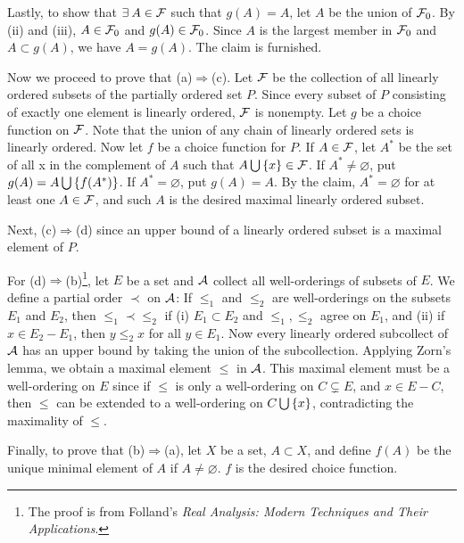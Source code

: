 \begin{pf}
    Lastly, to show that $\exists\: A\in\mathcal{F}$ such that $g(A)=A$, 
    let $A$ be the union of $\mathcal{F}_0$. By (ii) and (iii), $A\in
    \mathcal{F}_0$ and $g(A)\in\mathcal{F}_0$. Since $A$ is the largest member 
    in $\mathcal{F}_0$ and $A\subset g(A)$, we have $A=g(A)$. The claim 
    is furnished. 

    Now we proceed to prove that (a)$\Rightarrow$(c). Let $\mathcal{F}$ 
    be the collection of all linearly ordered subsets of the 
    partially ordered set $P$. Since every subset of $P$ 
    consisting of exactly one element is linearly ordered, $\mathcal{F}$ 
    is nonempty. Let $g$ be a choice function on $\mathcal{F}$. Note 
    that the union of any chain of linearly ordered sets is 
    linearly ordered. Now let $f$ be a choice function for $P$. 
    If $A\in\mathcal{F}$, let $A^*$ be the set of all x in the 
    complement of $A$ such that $A\bigcup\left\{ {x} \right\}\in\mathcal{F}$. If $A^* 
    \neq\varnothing$, put $g(A)=A\bigcup\left\{ {f(A^*)} \right\}$. If 
    $A^*=\varnothing$, put $g(A)=A$. By the claim, $A^*=
    \varnothing$ for at least one $A\in\mathcal{F}$, and such $A$ is the 
    desired maximal linearly ordered subset. 

    Next, (c)$\Rightarrow$(d) since an upper bound of a 
    linearly ordered subset is a maximal element of $P$. 

    For (d)$\Rightarrow$(b)\footnote{The proof is from 
    Folland's \textit{Real Analysis: Modern Techniques and 
    Their Applications}.}, let $E$ be a set and $\mathcal{A}$ collect 
    all well-orderings of subsets of $E$. We define a partial 
    order $\prec$ on $\mathcal{A}$: If $\leq_1$ and $\leq_2$ are 
    well-orderings on the subsets $E_1$ and $E_2$, then 
    $\leq_1\prec\leq_2$ if (i) $E_1\subset E_2$ and $\leq_1, 
    \leq_2$ agree on $E_1$, and (ii) if $x\in E_2-E_1$, then 
    $y\leq_2 x$ for all $y\in E_1$. Now every linearly ordered 
    subcollect of $\mathcal{A}$ has an upper bound by taking the union 
    of the subcollection. Applying Zorn's lemma, we obtain a 
    maximal element $\leq$ in $\mathcal{A}$. This maximal element must 
    be a well-ordering on $E$ since if $\leq$ is only a 
    well-ordering on $C\subsetneq E$, and $x\in E-C$, then 
    $\leq$ can be extended to a well-ordering on $C\bigcup
    \left\{ {x} \right\}$, contradicting the maximality of $\leq$.   

    Finally, to prove that (b)$\Rightarrow$(a), let $X$ be a 
    set, $A\subset X$, and define $f(A)$ be the unique minimal 
    element of $A$ if $A\neq\varnothing$. $f$ is the desired 
    choice function.
\end{pf}

